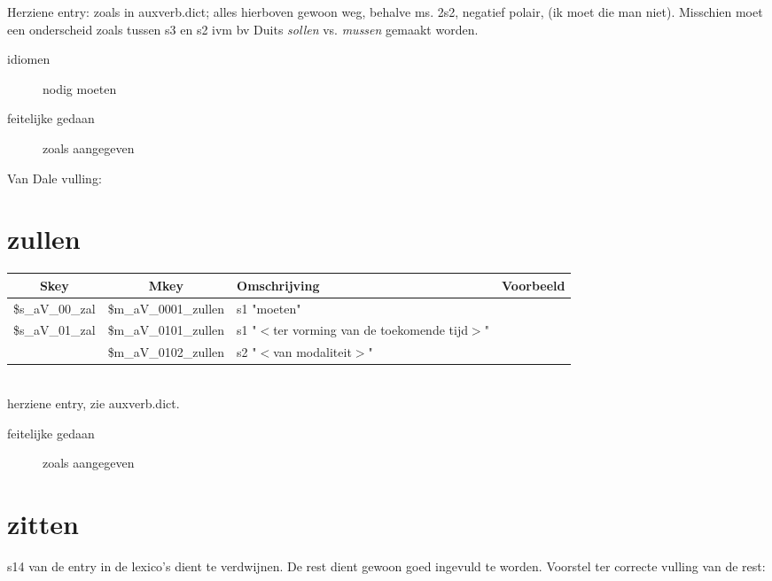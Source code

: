 Herziene entry: zoals in auxverb.dict; alles hierboven gewoon weg, behalve ms. 2s2, negatief polair, (ik moet die man niet).
Misschien moet een onderscheid zoals tussen s3 en s2 ivm bv Duits {\em  sollen}
vs. {\em mussen} gemaakt worden.

\begin{description}
  \item[idiomen] nodig moeten
\end{description}



\begin{description}
\item[feitelijke gedaan] zoals aangegeven
\end{description}

\newpage
Van Dale vulling:\\
\section{zullen}

\begin{tabular}[t]{|c|c|p{}|p{}|}
\hline
Skey          & Mkey            & Omschrijving & Voorbeeld\\
\hline
\$s\_aV\_00\_zal & \$m\_aV\_0001\_zullen & s1 "moeten"&\\
\$s\_aV\_01\_zal & \$m\_aV\_0101\_zullen & s1 "$<$ter vorming van de toekomende tijd$>$"&\\
             & \$m\_aV\_0102\_zullen & s2 "$<$van modaliteit$>$"&\\
\hline
\end{tabular}\\

herziene entry, zie auxverb.dict.

\begin{description}
\item[feitelijke gedaan] zoals aangegeven
\end{description}

\newpage
\section{zitten}

s14 van de entry in de lexico's dient te verdwijnen.
De rest dient gewoon goed ingevuld
te worden.
Voorstel ter correcte vulling van de rest:

